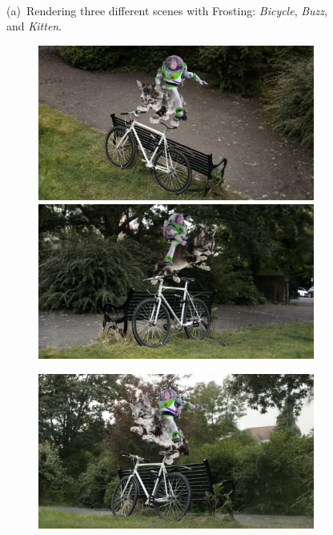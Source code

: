 \begin{figure}[ht]
\begin{subfigure}{0.31\linewidth}
  \end{subfigure}\\
  {\small (a)~Rendering three different scenes with Frosting: \textit{Bicycle}, \textit{Buzz}, and \textit{Kitten}.}\\
  \begin{subfigure}{0.49\linewidth}
  \includegraphics[width=\linewidth]{images/composition/buzz_riding_cat/0_0.png}
  \includegraphics[width=\linewidth]{images/composition/buzz_riding_cat/0_3.png}
  \end{subfigure}
  \hfill
  \begin{subfigure}{0.49\linewidth}
  \includegraphics[width=\linewidth]{images/composition/buzz_riding_cat/0_1.png}

\end{subfigure}
\end{figure}
